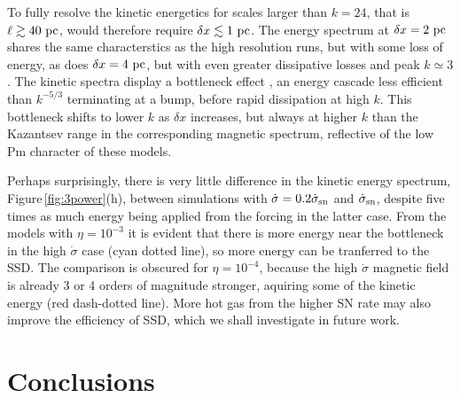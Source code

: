 \documentclass[preprint2]{aastex63}
\newcommand\SNr{\dot\sigma_{\rm sn}}
\newcommand\pc{~ {\rm pc}}
\newcommand\dx{ {\delta x}}
\begin{document}
To fully resolve the kinetic energetics for scales larger than $k=24$, that is
$\ell\gtrsim40\pc$, would therefore require $\dx\lesssim1\pc$.
The energy spectrum at $\dx=2\pc$ shares the same characterstics as the high
resolution runs, but with some loss of energy, as does $\dx=4\pc$, but with 
even greater dissipative losses and peak $k\simeq3$.
The kinetic spectra display a bottleneck effect \citep{Falkovich94,HBD03},
an energy cascade less efficient than $k^{-5/3}$ terminating at a bump,
before rapid dissipation at high $k$.
This bottleneck shifts to lower $k$ as $\dx$ increases, but always at higher
$k$ than the Kazantsev range in the corresponding magnetic spectrum, reflective
of the low Pm character of these models.

Perhaps surprisingly, there is very little difference in the kinetic energy
spectrum, Figure\,\ref{fig:3power}(h), between simulations with
$\dot\sigma=0.2\SNr$ and $\SNr$, despite five times as much energy being 
applied from the forcing in the latter case.
From the models with $\eta=10^{-3}$ it is evident that there is more energy
near the bottleneck in the high $\dot\sigma$ case (cyan dotted line), so more
energy can be tranferred to the SSD.
The comparison is obscured for $\eta=10^{-4}$, because the high $\dot\sigma$
magnetic field is already 3 or 4 orders of magnitude stronger, aquiring some of
the kinetic energy (red dash-dotted line).
More hot gas from the higher SN rate may also improve the efficiency of SSD,
which we shall investigate in future work. 



\section{Conclusions}\label{sec:conc}
\end{document}
